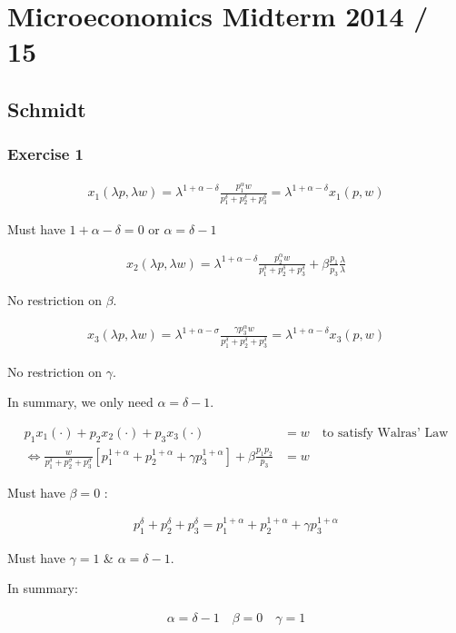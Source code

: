 \section{Microeconomics Midterm 2014 / 15}

{
\subsection*{Schmidt}

\subsubsection*{Exercise 1}

\begin{enumerate}[label=(\alph*)]
{\item 
\begin{align*}
    x_{1}(\lambda p, \lambda w)=\lambda^{1+\alpha-\delta} \frac{p_{1}^{\alpha} w}{p_{1}^{\delta}+p_{2}^{\delta}+p_{3}^{\delta}}=\lambda^{1+\alpha-\delta} x_{1}(p, w)
\end{align*}

Must have $1+\alpha-\delta=0$ or $\alpha=\delta-1$

\begin{align*}
    x_{2}(\lambda p, \lambda w)=\lambda^{1+\alpha-\delta} \frac{p_{2}^{\alpha} w}{p_{1}^{\delta}+p_{2}^{\delta}+p_{3}^{\delta}}+\beta \frac{p_{1}}{p_{3}} \frac{\lambda}{\lambda}
\end{align*}

No restriction on $\beta$.

\begin{align*}
    x_{3}(\lambda p, \lambda w)=\lambda^{1+\alpha-\sigma} \frac{\gamma p_{3}^{\alpha} w}{p_{1}^{\delta}+p_{2}^{\delta}+p_{3}^{\delta}}=\lambda^{1+\alpha-\delta} x_{3}(p, w)
\end{align*}

No restriction on $\gamma$.

In summary, we only need $\alpha=\delta-1$.
}
{\item 

\begin{align*}
    p_{1} x_{1}(\cdot)+p_{2} x_{2}(\cdot)+p_{3} x_{3}(\cdot) &= w \quad \text{to satisfy Walras' Law} \\
    \Leftrightarrow \frac{w}{p_{1}^{\delta}+p_{2}^{\sigma}+p_{3}^{\sigma}}\left[p_{1}^{1+\alpha}+p_{2}^{1+\alpha}+\gamma p_{3}^{1+\alpha}\right]+\beta \frac{p_{1} p_{2}}{p_{3}} &= w
\end{align*}

Must have $\beta=0$ :

\begin{align*}
    p_{1}^{\delta}+p_{2}^{\delta}+p_{3}^{\delta}=p_{1}^{1+\alpha}+p_{2}^{1+\alpha}+\gamma p_{3}^{1+\alpha}
\end{align*}

Must have $\gamma=1$ \& $\alpha=\delta-1$.

In summary:

\begin{align*}
    \alpha=\delta-1 \quad \beta=0 \quad \gamma=1
\end{align*}
}
\end{enumerate}
}
